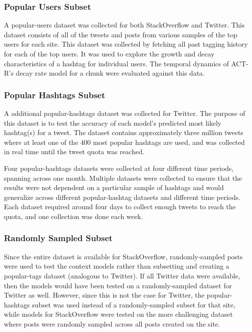 \documentclass[man,floatsintext,donotrepeattitle]{apa6}
\begin{document}
\subsubsection{Popular Users Subset}

A popular-users dataset was collected for both StackOverflow and Twitter.
This dataset consists of all of the tweets and posts from various samples of the top users for each site.
This dataset was collected by fetching all past tagging history for each of the top users.
It was used to explore the growth and decay characteristics of a hashtag for individual users.
The temporal dynamics of ACT-R's decay rate model for a chunk were evaluated against this data.

\subsubsection{Popular Hashtags Subset}

A additional popular-hashtags dataset was collected for Twitter.
The purpose of this dataset is to test the accuracy of each model's predicted most likely hashtag(s) for a tweet.
The dataset contains approximately three million tweets where at least one of the 400 most popular hashtags are used, and was collected in real time until the tweet quota was reached.

Four popular-hashtags datasets were collected at four different time periods, spanning across one month.
Multiple datasets were collected to ensure that the results were not dependent on a particular sample of hashtags and would generalize across different popular-hashtag datasets and different time periods.
Each dataset required around four days to collect enough tweets to reach the quota, and one collection was done each week.

\subsubsection{Randomly Sampled Subset}

Since the entire dataset is available for StackOverflow, randomly-sampled posts were used to test the context models rather than subsetting and creating a popular-tags dataset (analogous to Twitter).
If all Twitter data were available, then the models would have been tested on a randomly-sampled dataset for Twitter as well.
However, since this is not the case for Twitter, the popular-hashtags subset was used instead of a randomly-sampled subset for that site,
while models for StackOverflow were tested on the more challenging dataset where posts were randomly sampled across all posts created on the site.
\end{document}

